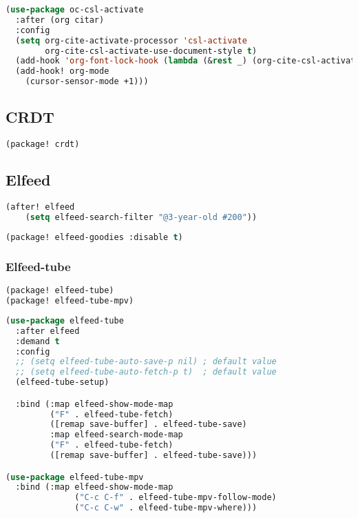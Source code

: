 \documentclass[11pt]{article}
\begin{document}
\begin{lstlisting}[language=Lisp]
(use-package oc-csl-activate
  :after (org citar)
  :config
  (setq org-cite-activate-processor 'csl-activate
        org-cite-csl-activate-use-document-style t)
  (add-hook 'org-font-lock-hook (lambda (&rest _) (org-cite-csl-activate-render-all)))
  (add-hook! org-mode
    (cursor-sensor-mode +1)))
\end{lstlisting}


\subsection{CRDT}
\label{sec:crdt}
\begin{lstlisting}[language=Lisp]
(package! crdt)
\end{lstlisting}

\subsection{Elfeed}
\label{sec:elfeed}
\begin{lstlisting}[language=Lisp]
(after! elfeed
    (setq elfeed-search-filter "@3-year-old #200"))
\end{lstlisting}

\begin{lstlisting}[language=Lisp]
(package! elfeed-goodies :disable t)
\end{lstlisting}

\subsubsection{Elfeed-tube}
\label{sec:elfeed-tube}
\begin{lstlisting}[language=Lisp]
(package! elfeed-tube)
(package! elfeed-tube-mpv)
\end{lstlisting}

\begin{lstlisting}[language=Lisp]
(use-package elfeed-tube
  :after elfeed
  :demand t
  :config
  ;; (setq elfeed-tube-auto-save-p nil) ; default value
  ;; (setq elfeed-tube-auto-fetch-p t)  ; default value
  (elfeed-tube-setup)

  :bind (:map elfeed-show-mode-map
         ("F" . elfeed-tube-fetch)
         ([remap save-buffer] . elfeed-tube-save)
         :map elfeed-search-mode-map
         ("F" . elfeed-tube-fetch)
         ([remap save-buffer] . elfeed-tube-save)))

(use-package elfeed-tube-mpv
  :bind (:map elfeed-show-mode-map
              ("C-c C-f" . elfeed-tube-mpv-follow-mode)
              ("C-c C-w" . elfeed-tube-mpv-where)))
\end{lstlisting}
\end{document}
